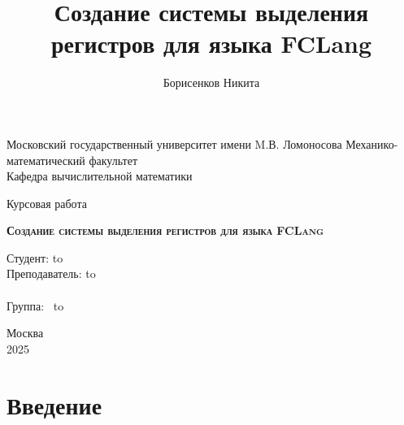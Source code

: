 \documentclass[a4paper,14pt]{extarticle}
\author{Борисенков Никита}
\title{Создание системы выделения регистров для языка FCLang}
\begin{document}
\begin{titlepage}
    \newpage
    \begin{center}
        Московский государственный университет имени M.В. Ломоносова
        Механико-математический факультет\\
        Кафедра вычислительной математики \\
    \end{center}

    \vspace{8em}

    \begin{center}
        \Large Курсовая работа \\
    \end{center}

    \vspace{2em}

    \begin{center}
        \textsc{\textbf{Создание системы выделения регистров для языка FCLang}}
    \end{center}

    \vspace{20em}



    \newbox{\lbox}
    \newlength{\maxl}
    \setlength{\maxl}{\wd\lbox}
    \hfill\parbox{13cm}{
        \hspace*{5cm}\hspace*{-5cm}Студент: \qquad\qquad\hbox to \\
        \hspace*{5cm}\hspace*{-5cm}Преподаватель: \hbox to \\
        \\
        \hspace*{5cm}\hspace*{-5cm}Группа:\qquad\qquad $\;\:$ \hbox to\\
    }


    \vspace{\fill}

    \begin{center}
        Москва \\2025
    \end{center}

\end{titlepage}
\newpage

\section*{Введение}
\end{document}
